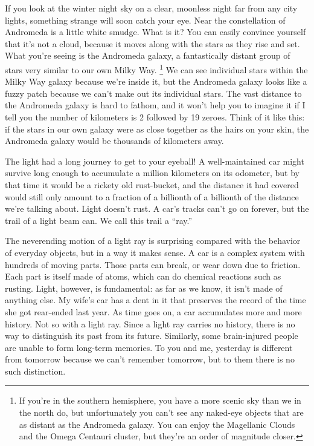 \label{ch:raymodel}


If you look at the winter night sky on a clear, moonless night far from any city
lights, something strange will soon catch your eye. Near the constellation of Andromeda
is a little white smudge. What is it? You can easily convince yourself that it's
not a cloud, because it moves along with the stars as they rise and set. What you're
seeing is the Andromeda galaxy, a fantastically distant group of stars very similar
to our own Milky Way.%
\footnote{If you're in the
southern hemisphere, you have a more scenic sky than we in the north do, but
unfortunately you can't see any naked-eye objects that are as distant as the
Andromeda galaxy. You can enjoy the Magellanic Clouds and the Omega Centauri
cluster, but they're an order of magnitude closer.}
We can see individual stars within the Milky Way galaxy because
we're inside it, but the Andromeda galaxy looks like a fuzzy patch because we can't
make out its individual stars.
The vast distance to the Andromeda galaxy is hard to fathom, and it won't help
you to imagine it if I tell you the number of kilometers is 2 followed by 
19 zeroes.
Think of it like this: if the stars in our own galaxy were as close together
as the hairs on your skin, the Andromeda galaxy would be thousands of kilometers
away.

The light had a long journey to get to your eyeball! A well-maintained car might
survive long enough to accumulate a million kilometers on its odometer, but
by that time it would be a rickety old rust-bucket, and the distance it had covered would
still only amount to a fraction of a billionth of a billionth of the distance
we're talking about. Light doesn't rust. A car's tracks can't
go on forever, but the trail of a light beam can. We call this
trail a ``ray.''


The neverending motion of a light ray is surprising compared
with the behavior of everyday objects, but in a way it makes sense. A car is
a complex system with hundreds of moving parts. Those parts can break,
or wear down due to friction. Each part is itself made of atoms, which can
do chemical reactions such as rusting. 
Light, however, is fundamental: as far as we know, it isn't
made of anything else. 
My wife's car has a dent in it that preserves the record of the time she
got rear-ended last year. As time goes on, a car accumulates more and more history.
Not so with a light ray. Since a light ray carries no history, there is no way
to distinguish its past from its future. Similarly, some brain-injured people
are unable to form long-term memories. To you and me, yesterday is different
from tomorrow because we can't remember tomorrow, but to them there is no such
distinction.

